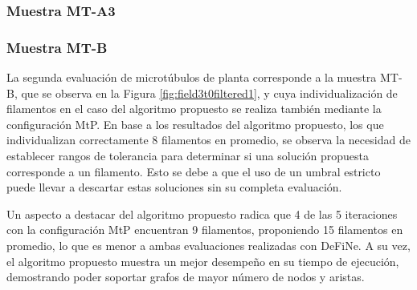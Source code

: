 \subsubsection{Muestra MT-A3}

\subsubsection{Muestra MT-B}
La segunda evaluaci\'on de microt\'ubulos de planta corresponde a la muestra MT-B, que se observa en la Figura \ref{fig:field3t0filtered1}, y cuya individualizaci\'on de filamentos en el caso del algoritmo propuesto se realiza tambi\'en mediante la configuraci\'on MtP. En base a los resultados del algoritmo propuesto, los que individualizan correctamente 8 filamentos en promedio, se observa la necesidad de establecer rangos de tolerancia para determinar si una soluci\'on propuesta corresponde a un filamento. Esto se debe a que el uso de un umbral estricto puede llevar a descartar estas soluciones sin su completa evaluaci\'on.

Un aspecto a destacar del algoritmo propuesto radica que 4 de las 5 iteraciones con la configuraci\'on MtP encuentran 9 filamentos, proponiendo 15 filamentos en promedio, lo que es menor a ambas evaluaciones realizadas con DeFiNe. A su vez, el algoritmo propuesto muestra un mejor desempe\~no en su tiempo de ejecuci\'on, demostrando poder soportar grafos de mayor n\'umero de nodos y aristas.


